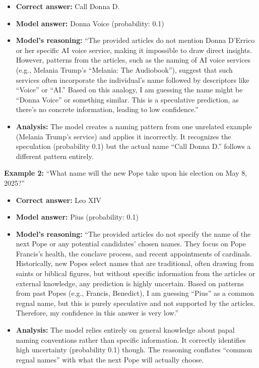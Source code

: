 \documentclass{article} %
\begin{document}
\begin{itemize}
\item \textbf{Correct answer:} Call Donna D.
\item \textbf{Model answer:} Donna Voice (probability: 0.1)
\item \textbf{Model's reasoning:} ``The provided articles do not mention Donna D'Errico or her specific AI voice service, making it impossible to draw direct insights. However, patterns from the articles, such as the naming of AI voice services (e.g., Melania Trump's ``Melania: The Audiobook''), suggest that such services often incorporate the individual's name followed by descriptors like ``Voice'' or ``AI.'' Based on this analogy, I am guessing the name might be ``Donna Voice'' or something similar. This is a speculative prediction, as there's no concrete information, leading to low confidence.''
\item \textbf{Analysis:} The model creates a naming pattern from one unrelated example (Melania Trump's service) and applies it incorrectly. It recognizes the speculation (probability 0.1) but the actual name ``Call Donna D.'' follows a different pattern entirely.
\end{itemize}

\textbf{Example 2:} ``What name will the new Pope take upon his election on May 8, 2025?''

\begin{itemize}
\item \textbf{Correct answer:} Leo XIV
\item \textbf{Model answer:} Pius (probability: 0.1)
\item \textbf{Model's reasoning:} ``The provided articles do not specify the name of the next Pope or any potential candidates' chosen names. They focus on Pope Francis's health, the conclave process, and recent appointments of cardinals. Historically, new Popes select names that are traditional, often drawing from saints or biblical figures, but without specific information from the articles or external knowledge, any prediction is highly uncertain. Based on patterns from past Popes (e.g., Francis, Benedict), I am guessing ``Pius'' as a common regnal name, but this is purely speculative and not supported by the articles. Therefore, my confidence in this answer is very low.''
\item \textbf{Analysis:} The model relies entirely on general knowledge about papal naming conventions rather than specific information. It correctly identifies high uncertainty (probability 0.1) though. The reasoning conflates ``common regnal names'' with what the next Pope will actually choose.
\end{itemize}
\end{document}
